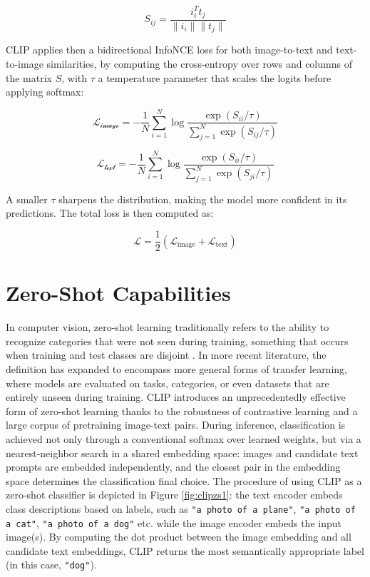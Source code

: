 \documentclass[a4paper, twoside, english]{sapthesis} %
\begin{document}
\begin{equation}\label{sim_matrix}
    S_{ij} = \frac{i_i^Tt_j}{\|i_i\| \| t_j\|}
\end{equation}

CLIP applies then a bidirectional InfoNCE loss for both image-to-text and text-to-image similarities, by computing the cross-entropy over rows and columns of the matrix $S$, with $\tau$ a temperature parameter that scales the logits before applying softmax:

\begin{equation} \label{L_image}
    \mathcal{L_{\text{image}}} = - \frac{1}{N} \sum_{i=1}^N \log \frac{\exp(S_{ii}/\tau)}{\sum_{j=1}^N \exp (S_{ij}/\tau)}
\end{equation}

\begin{equation} \label{L_text}
    \mathcal{L_{\text{text}}} = - \frac{1}{N} \sum_{i=1}^N \log \frac{\exp(S_{ii}/\tau)}{\sum_{j=1}^N \exp (S_{ji}/\tau)}
\end{equation}

A smaller $\tau$ sharpens the distribution, making the model more confident in its predictions. The total loss is then computed as:

\begin{equation}
    \mathcal{L} = \frac{1}{2} (\mathcal{L}_{\text{image}} + \mathcal{L}_{\text{text}})
\end{equation}



\section{Zero-Shot Capabilities}

In computer vision, zero-shot learning traditionally refers to the ability to recognize categories that were not seen during training, something that occurs when training and test classes are disjoint \cite{lampert2009learning}. In more recent literature, the definition has expanded to encompass more general forms of transfer learning, where models are evaluated on tasks, categories, or even datasets that are entirely unseen during training.
CLIP introduces an unprecedentedly effective form of zero-shot learning thanks to the robustness of contrastive learning and a large corpus of pretraining image-text pairs. During inference, classification is achieved not only through a conventional softmax over learned weights, but via a nearest-neighbor search in a shared embedding space: images and candidate text prompts are embedded independently, and the closest pair in the embedding space determines the classification final choice. The procedure of using CLIP as a zero-shot classifier is depicted in Figure \ref{fig:clipzs1}: the text encoder embeds class descriptions based on labels, such as
\texttt{"a photo of a plane"}, \texttt{"a photo of a cat"}, \texttt{"a photo of a dog"} etc. while the image encoder embeds the input image(s). By computing the dot product between the image embedding and all candidate text embeddings, CLIP returns the most semantically appropriate label (in this case, \texttt{"dog"}). 
\end{document}
